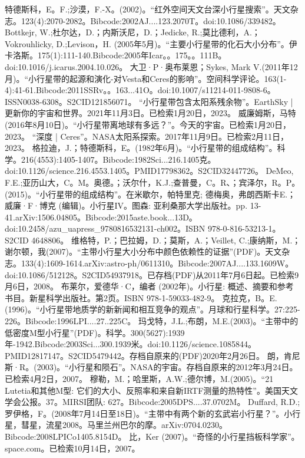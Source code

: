 \begin{enumerate}
 特德斯科，E。F.;沙漠，F.-X。(2002)。“红外空间天文台深小行星搜索”。天文杂志。123(4):2070-2082。Bibcode:2002AJ....123.2070T。doi:10.1086/339482。
 Bottkejr, W.;杜尔达，D.；内斯沃尼，D.；Jedicke, R.;莫比德利，A.；Vokrouhlicky, D.;Levison，H. (2005年5月)。“主要小行星带的化石大小分布”。伊卡洛斯。175(1):111-140.Bibcode:2005年Icar。。175。。111B。doi:10.1016/j.icarus.2004.10.026。
 大卫·P·奥布莱恩；Sykes, Mark V.(2011年12月)。“小行星带的起源和演化-对Vesta和Ceres的影响”。空间科学评论。163(1-4):41-61.Bibcode:2011SSRv。。163...41O。doi:10.1007/s11214-011-9808-6。ISSN0038-6308。S2CID121856071。  
 “小行星带包含太阳系残余物”。EarthSky | 更新你的宇宙和世界。2021年11月3日。已检索1月20日，2023。
 威廉姆斯，马特 (2016年8月10日)。“小行星带离地球有多远？”。今天的宇宙。已检索1月20日，2023。
 “深度 | Ceres”。NASA太阳系探索。2017年11月9日。已检索2月11日，2023。
 格拉迪，J.；特德斯科，E。(1982年6月)。“小行星带的组成结构”。科学。216(4553):1405-1407。Bibcode:1982Sci...216.1405克。doi:10.1126/science.216.4553.1405。PMID17798362。S2CID32447726。  
 DeMeo, F.E.;亚历山大，C。M。奥德。；沃尔什，K.J.;查普曼，C。R、；宾泽尔，R。P。(2015)。“小行星带的组成结构”。在米歇尔，帕特里克; 德梅奥，弗朗西斯卡E.；威廉·F·博克 (编辑)。小行星IV。图森: 亚利桑那大学出版社。pp. 13-41.arXiv:1506.04805。Bibcode:2015aste.book...13D。doi:10.2458/azu_uapress_9780816532131-ch002。ISBN 978-0-816-53213-1。S2CID 4648806。
 维格特，P.；巴拉姆，D.；莫斯，A.；Veillet, C.;康纳斯，M.；谢尔顿，我(2007)。“主带小行星大小分布中颜色依赖性的证据”(PDF)。天文杂志。133(4):1609-1614.arXiv:astro-ph/0611310。Bibcode:2007AJ....133.1609W。doi:10.1086/512128。S2CID54937918。已存档(PDF)从2011年7月6日起。已检索9月6日，2008。  
 布莱尔，爱德华·C，编者 (2002年)。小行星: 概述、摘要和参考书目。新星科学出版社。第2页。ISBN 978-1-59033-482-9。
 克拉克，B。E.(1996)。“小行星带地质学的新新闻和相互竞争的观点”。月球和行星科学。27:225-226。Bibcode:1996LPI....27..225C。
 玛戈特，J.L.;布朗，M.E.(2003)。“主带中的低密度M型小行星”(PDF)。科学。300(5627):1939年-1942.Bibcode:2003Sci...300.1939米。doi:10.1126/science.1085844。PMID12817147。S2CID5479442。存档自原来的(PDF)2020年2月26日。   
 朗，肯尼斯·R。(2003)。“小行星和陨石”。NASA的宇宙。存档自原来的2012年3月24日。已检索4月2日，2007。
 穆勒，M.；哈里斯，A.W.;德尔博，M.(2005)。“21 Lutetia和其他M型: 它们的大小、反照率和来自新IRTF测量的热特性”。美国天文学会公报。37。MIRSI团队: 627。Bibcode:2005DPS....37.0702M。
 Duffard, R.D.;罗伊格，F。(2008年7月14日至18日)。“主带中有两个新的玄武岩小行星？”。小行星，彗星，流星2008。马里兰州巴尔的摩。arXiv:0704.0230。Bibcode:2008LPICo1405.8154D。
 比，Ker (2007)。“奇怪的小行星挡板科学家”。space.com。已检索10月14日，2007。

\end{enumerate}
